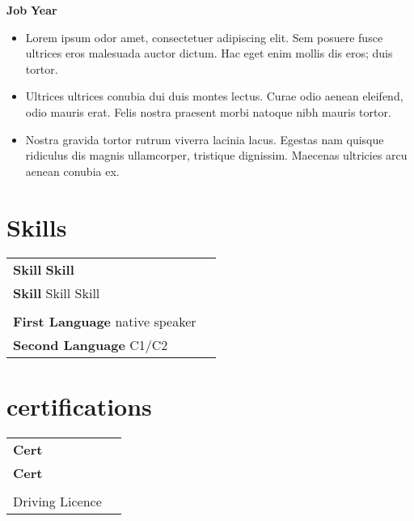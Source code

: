 \documentclass[11pt]{article}
\newcommand{\pc}{\textperiodcentered}
\newcommand{\jobentry}[4]{%
    {\Large\textbf{#1}} \hfill {\large\textbf{#3}} \\%
    \rlap{\large\textbf{#2}} \hfill #4%
}
\begin{document}
\begin{paracol}{2}
    \medskip
    
    \jobentry{Job}{Place}{Year}{}

    \begin{itemize}
        \item Lorem ipsum odor amet, consectetuer adipiscing elit. Sem posuere fusce ultrices eros malesuada auctor dictum. Hac eget enim mollis dis eros; duis tortor.
        \item Ultrices ultrices conubia dui duis montes lectus. Curae odio aenean eleifend, odio mauris erat. Felis nostra praesent morbi natoque nibh mauris tortor.
        \item Nostra gravida tortor rutrum viverra lacinia lacus. Egestas nam quisque ridiculus dis magnis ullamcorper, tristique dignissim. Maecenas ultricies arcu aenean conubia ex.
        \end{itemize}
    

    \switchcolumn

    \section{Skills}
    \begin{supertabular}{ll}
        \textbf{Skill} \pc{} \textbf{Skill} \\
        \textbf{Skill} \pc{} Skill \pc{} Skill \\
        
        \phantom{}\\
        
        \textbf{First Language} \pc{} native speaker \\
        \textbf{Second Language} \pc{} C1/C2 \\

    \end{supertabular}
    

    \section{certifications}
    \begin{supertabular}{ll}
        \textbf{Cert} \\
        \textbf{Cert} \\
        \phantom{}\\
        Driving Licence \\
    \end{supertabular}
    

    \pagebreak
    \switchcolumn*


\end{paracol}
\end{document}
